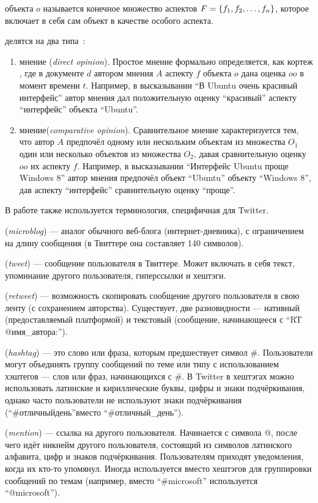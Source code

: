 { объекта} $o$ называется конечное множество аспектов $F = \left \{ f_1, f_2, \ldots , f_n \right \}$, которое включает в себя сам объект в качестве особого аспекта.

{} делятся на два типа~\cite{multi_faceted}:
\begin{enumerate}

\item{
  {} мнение (\textit{direct opinion}). Простое мнение формально определяется, как кортеж , где в документе $d$ автором мнения $A$ аспекту $f$ объекта $o$ дана оценка $oo$ в момент времени $t$. Например, в высказывании ``В Ubuntu очень красивый интерфейс'' автор мнения дал положительную оценку ``красивый'' аспекту ``интерфейс'' объекта ``Ubuntu''.
}

\item{
  {} мнение(\textit{comparative opinion}). Сравнительное мнение характеризуется тем, что автор $A$ предпочёл одному или нескольким объектам из множества $O_1$ один или несколько объектов из множества $O_2$, давая сравнительную оценку $oo$ их аспекту $f$. Например, в высказывании ``Интерфейс Ubuntu проще Windows 8'' автор мнения предпочёл объект ``Ubuntu'' объекту ``Windows 8'', дав аспекту ``интерфейс'' сравнительную оценку ``проще''. 
}

\end{enumerate}

В работе также используется терминология, специфичная для Twitter.

{} (\textit{microblog}) --- аналог обычного веб-блога (интернет-дневника), с ограничением на длину сообщения (в Твиттере она составляет 140 символов). 

{} (\textit{tweet}) --- сообщение пользователя в Твиттере. Может включать в себя текст, упоминание другого пользователя, гиперссылки и хештэги.

{} (\textit{retweet}) --- возможность скопировать сообщение другого пользователя в свою ленту (с сохранением авторства). Существует, две разновидности --- нативный (предоставляемый платформой) и текстовый (сообщение, начинающееся с ``RT @имя\_автора:'').

{} (\textit{hashtag}) --- это слово или фраза, которым предшествует символ \#. Пользователи могут объединять группу сообщений по теме или типу с использованием хэштегов — слов или фраз, начинающихся с \#. В Twitter в хештэгах можно использовать латинские и кириллические буквы, цифры и знаки подчёркивания, однако часто пользователи не используют знаки подчёркивания (``\#отличныйдень''вместо ``\#отличный\_день'').

{} (\textit{mention}) --- ссылка на другого пользователя.  Начинается с символа @, после чего идёт никнейм другого пользователя, состоящий из символов латинского алфавита, цифр и знаков подчёркивания. Пользователям приходят уведомления, когда их кто-то упомянул. Иногда используется вместо хештэгов для группировки сообщений по темам (например, вместо ``\#microsoft'' используется ``@microsoft'').